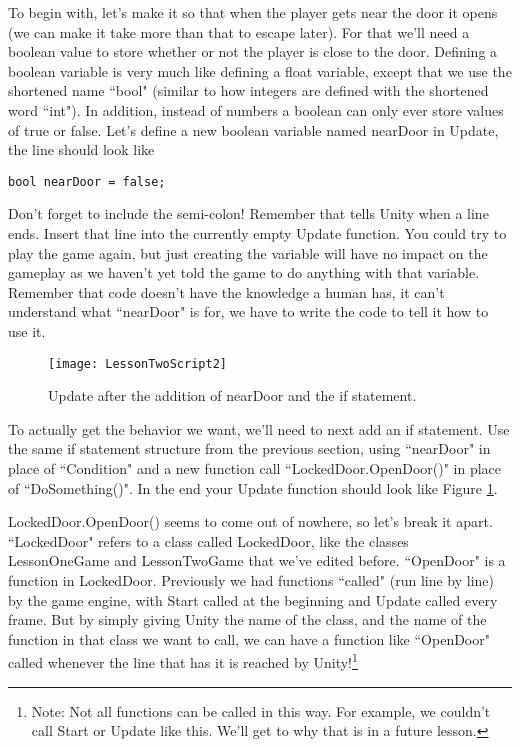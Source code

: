 \documentclass{article}
\begin{document}
To begin with, let's make it so that when the player gets near the door it opens (we can make it take more than that to escape later). For that we'll need a boolean value to store whether or not the player is close to the door. Defining a boolean variable is very much like defining a float variable, except that we use the shortened name ``bool" (similar to how integers are defined with the shortened word ``int"). In addition, instead of numbers a boolean can only ever store values of true or false. Let's define a new boolean variable named nearDoor in Update, the line should look like

\lstset{style=sharpc}
\begin{lstlisting}
bool nearDoor = false;
\end{lstlisting}

Don't forget to include the semi-colon! Remember that tells Unity when a line ends. Insert that line into the currently empty Update function. You could try to play the game again, but just creating the variable will have no impact on the gameplay as we haven't yet told the game to do anything with that variable. Remember that code doesn't have the knowledge a human has, it can't understand what ``nearDoor" is for, we have to write the code to tell it how to use it.

\begin{figure}
  \texttt{[image: LessonTwoScript2]}
  \caption{Update after the addition of nearDoor and the if statement.}
  \label{fig:LessonTwoScript2}
\end{figure}

To actually get the behavior we want, we'll need to next add an if statement. Use the same if statement structure from the previous section, using ``nearDoor" in place of ``Condition" and a new function call ``LockedDoor.OpenDoor()" in place of ``DoSomething()". In the end your Update function should look like Figure \ref{fig:LessonTwoScript2}. 

LockedDoor.OpenDoor() seems to come out of nowhere, so let's break it apart. ``LockedDoor" refers to a class called LockedDoor, like the classes LessonOneGame and LessonTwoGame that we've edited before. ``OpenDoor" is a function in LockedDoor. Previously we had functions ``called" (run line by line) by the game engine, with Start called at the beginning and Update called every frame. But by simply giving Unity the name of the class, and the name of the function in that class we want to call, we can have a function like ``OpenDoor" called whenever the line that has it is reached by Unity!\footnote{Note: Not all functions can be called in this way. For example, we couldn't call Start or Update like this. We'll get to why that is in a future lesson.} 
\end{document}
